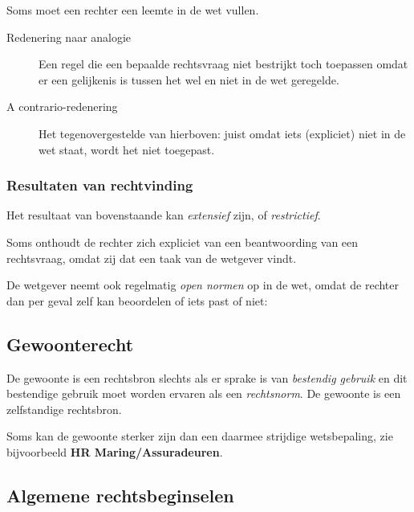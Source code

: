 \documentclass{article}
\begin{document}
Soms moet een rechter een leemte in de wet vullen. 

\begin{description}
  \item[Redenering naar analogie] Een regel die een bepaalde rechtsvraag niet
    bestrijkt toch toepassen omdat er een gelijkenis is tussen het wel en niet
    in de wet geregelde.
  \item[A contrario-redenering] Het tegenovergestelde van hierboven: juist omdat
    iets (expliciet) niet in de wet staat, wordt het niet toegepast.
\end{description}

\subsubsection{Resultaten van rechtvinding}

Het resultaat van bovenstaande kan \emph{extensief} zijn, of \emph{restrictief}. 

Soms onthoudt de rechter zich expliciet van een beantwoording van een
rechtsvraag, omdat zij dat een taak van de wetgever vindt. 

De wetgever neemt ook regelmatig \emph{open normen} op in de wet, omdat de
rechter dan per geval zelf kan beoordelen of iets past of niet: 

\subsection{Gewoonterecht}

De gewoonte is een rechtsbron slechts als er sprake is van \emph{bestendig
gebruik} en dit bestendige gebruik moet worden ervaren als een
\emph{rechtsnorm}. De gewoonte is een zelfstandige rechtsbron. 

Soms kan de gewoonte sterker zijn dan een daarmee strijdige wetsbepaling, zie
bijvoorbeeld \textbf{HR Maring/Assuradeuren}.

\subsection{Algemene rechtsbeginselen}
\end{document}
